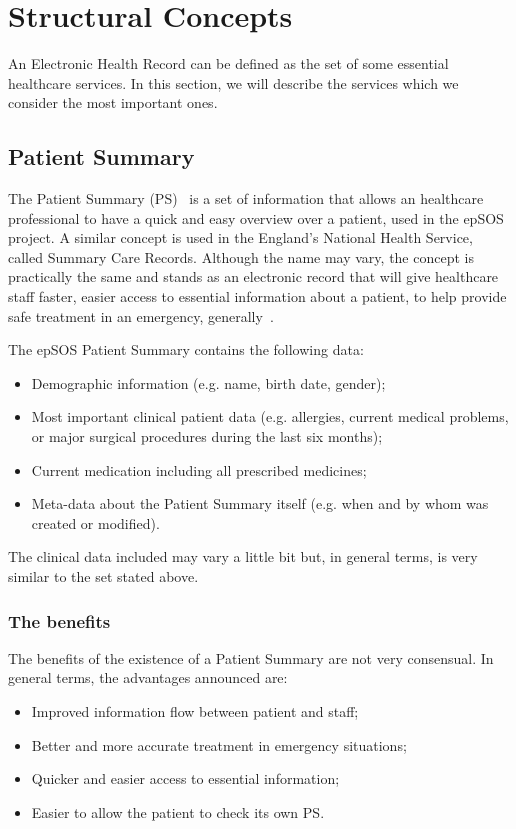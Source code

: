 \section{Structural Concepts}

An Electronic Health Record can be defined as the set of some essential healthcare services. In this section, we will describe the services which we consider the most important ones.

\subsection{Patient Summary}

The Patient Summary (PS)~\citep{EPSOS_PS} is a set of information that allows an healthcare professional to have a quick and easy overview over a patient, used in the epSOS project. A similar concept is used in the England's National Health Service, called Summary Care Records. Although the name may vary, the concept is practically the same and stands as an electronic record that will give healthcare staff faster, easier access to essential information about a patient, to help provide safe treatment in an emergency, generally~\citep{Service2010}.

The epSOS Patient Summary contains the following data:
\begin{itemize}
\item Demographic information (e.g. name, birth date, gender);
\item Most important clinical patient data (e.g. allergies, current medical problems, or major surgical procedures during the last six months);
\item Current medication including all prescribed medicines;
\item Meta-data about the Patient Summary itself (e.g. when and by whom was created or modified).
\end{itemize}

The clinical data included may vary a little bit but, in general terms, is very similar to the set stated above.

\subsubsection{The benefits}

The benefits of the existence of a Patient Summary are not very consensual. In general terms, the advantages announced are:
\begin{itemize}
\item Improved information flow between patient and staff;
\item Better and more accurate treatment in emergency situations;
\item Quicker and easier access to essential information;
\item Easier to allow the patient to check its own PS.
\end{itemize}

